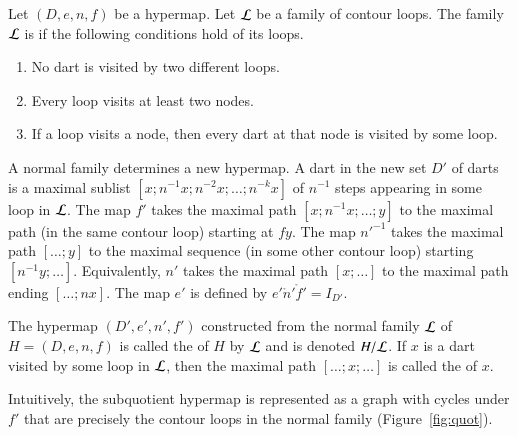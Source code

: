 \begin{definition}
Let $(D,e,n,f)$ be a hypermap. 
Let $\cal L$ be a family of contour
loops.  The family $\cal L$ is   if the following
conditions hold of its loops. \begin{enumerate}
\item  No dart is visited by two different loops.
\item  Every loop visits at least two nodes.
\item  If a loop visits a node, then every dart at that node is visited
by some loop.
\end{enumerate}
%
\end{definition}


A normal family determines a new hypermap.  A dart in the new set $D'$
of darts is a maximal sublist $[x;n^{-1} x; n^{-2} x;\ldots;n^{-k}
x]$ of $n^{-1}$ steps appearing in some loop in $\cal L$. The map $f'$
takes the maximal path $[x;n^{-1}x;\ldots;y]$ to the maximal path (in
the same contour loop) starting at $f y$. The map ${n'}^{-1}$ takes
the maximal path $[\ldots;y]$ to the maximal sequence (in some other
contour loop) starting $[n^{-1}y;\ldots]$. Equivalently, $n'$ takes
the maximal path $[x;\ldots]$ to the maximal path ending $[\ldots;n
x]$. The map $e'$ is defined by $e'\ocirc n'\ocirc f' = I_{D'}$.
%

\begin{definition}[subquotient]
 The hypermap $(D',e',n',f')$
constructed from the normal
family $\cal L$ of $H=(D,e,n,f)$ 
is called the  of $H$ by $\cal L$ and is denoted
$H/{\cal L}$.  If $x$ is a dart visited by some loop in $\cal L$, then
the maximal path $[\ldots;x;\ldots]$ is called the  of $x$.
%
\end{definition}
%
%
%
%

Intuitively, the subquotient hypermap is represented as a graph with
cycles under $f'$ that are precisely the contour loops in the normal family
(Figure~\ref{fig:quot}).



